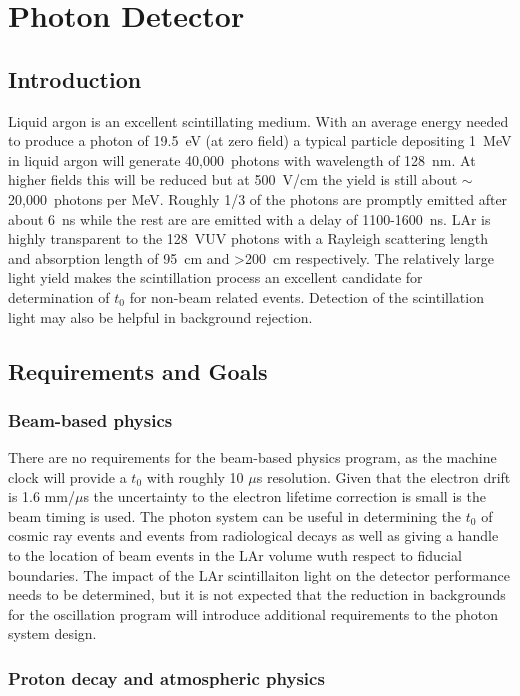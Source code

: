 \chapter{Photon Detector}
\label{ch:photon}
\section{Introduction}

Liquid argon is an excellent scintillating medium. With an average
energy needed to produce a photon of 19.5~eV (at zero field) a typical
particle depositing 1~MeV in liquid argon will generate 40,000~photons
with wavelength of 128~nm. At higher fields this will be reduced but
at 500~V/cm the yield is still about $\sim$20,000~photons per
MeV. Roughly 1/3 of the photons are promptly emitted after about 6~ns
while the rest are are emitted with a delay of 1100-1600~ns. LAr
is highly transparent to the 128~VUV photons with a Rayleigh
scattering length and absorption length of 95~cm and >200~cm
respectively. The relatively large light yield makes the scintillation
process an excellent candidate for determination of $t_{0}$ for
non-beam related events. Detection of the scintillation light may also
be helpful in background rejection.

\section{Requirements and Goals}

\subsection{Beam-based physics}

There are no requirements for the beam-based physics program, as the
machine clock will provide a $t_{0}$ with roughly 10 $\mu$s
resolution. Given that the electron drift is 1.6 mm/$\mu$s the
uncertainty to the electron lifetime correction is small is the beam
timing is used. The photon system can be useful in determining the
$t_{0}$ of cosmic ray events and events from radiological decays as
well as giving a handle to the location of beam events in the LAr
volume wuth respect to fiducial boundaries. The impact of the LAr
scintillaiton light on the detector performance needs to be
determined, but it is not expected that the reduction in backgrounds
for the oscillation program will introduce additional requirements to
the photon system design.

\subsection{Proton decay and atmospheric physics}

